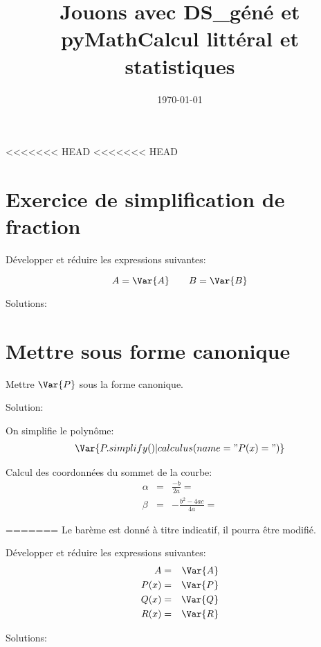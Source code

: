 \documentclass[a4paper,10pt]{article}
\title{Jouons avec DS\_géné et pyMath}
\date{}
\title{Calcul littéral et statistiques}
\date{\today}
\begin{document}
\maketitle

<<<<<<< HEAD
<<<<<<< HEAD
\section{Exercice de simplification de fraction}
		Développer et réduire les expressions suivantes:

		\begin{equation*}
            A = \Var{ A } \qquad
            B = \Var{ B }
		\end{equation*}

        Solutions:

\section{Mettre sous forme canonique}
    Mettre $\Var{P}$ sous la forme canonique.

    Solution:

    On simplifie le polynôme:
    \begin{eqnarray*}
        \Var{P.simplify() | calculus(name = "P(x) = ")}
    \end{eqnarray*}
    

    Calcul des coordonnées du sommet de la courbe:
    \begin{eqnarray*}
        \alpha & = & \frac{-b}{2a} =  \\
        \beta & = & -\frac{b^2 - 4ac}{4a} = 
    \end{eqnarray*}
    
=======
\Calc
Le barème est donné à titre indicatif, il pourra être modifié.

\begin{Exo}[4.5]
		Développer et réduire les expressions suivantes:
            \begin{eqnarray*}
                A &=& \Var{ A } \\
                P(x) &=& \Var{ P } \\
                Q(x) &=& \Var{ Q }\\
                R(x) &=& \Var{R} 
            \end{eqnarray*}

        Solutions:

\end{Exo}
\end{document}
